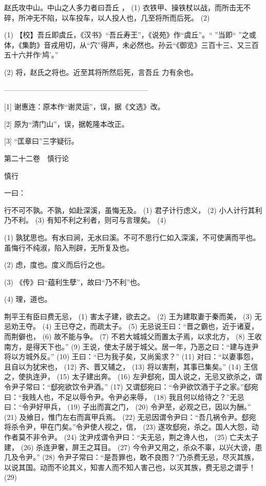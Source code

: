 \documentclass[12pt,UTF8]{ctexbook}
\begin{document}
赵氏攻中山。中山之人多力者曰吾丘 ， (1) 衣铁甲、操铁杖以战，而所击无不碎，所冲无不陷，以车投车，以人投人也，几至将所而后死。 (2)

(1) 【校】吾丘即虞丘，《汉书》“吾丘寿王”，《说苑》作“虞丘”。“ ”当即“ ”之或体，《集韵》音戎用切，从“穴”得声，未必然也。孙云“《御览》三百十三、又三百五十六并作‘鸠’。”

(2) 将，赵氏之将也。近至其将所然后死，言吾丘 力有余也。




————————————————————

[1] 谢惠连：原本作“谢灵运”，误，据《文选》改。

[2] 原为“清门山”，误，据乾隆本改正。

[3] “匡章曰”三字疑衍。





第二十二卷　慎行论



慎行


一曰：

行不可不孰。不孰，如赴深溪，虽悔无及。 (1) 君子计行虑义， (2) 小人计行其利乃不利。 (3) 有知不利之利者，则可与言理矣。 (4)

(1) 孰犹思也。有水曰涧，无水曰溪。不可不思行仁如入深溪，不可使满而平也。虽悔行不纯淑，陷入刑辟，无所复及也。

(2) 虑，度也。度义而后行之也。

(3) 《传》曰“蕴利生孽”，故曰“乃不利”也。

(4) 理，道也。

荆平王有臣曰费无忌， (1) 害太子建，欲去之。 (2) 王为建取妻于秦而美， (3) 无忌劝王夺。 (4) 王已夺之，而疏太子。 (5) 无忌说王曰：“晋之霸也，近于诸夏，而荆僻也， (6) 故不能与争。 (7) 不若大城城父而置太子焉，以求北方， (8) 王收南方，是得天下也。” (9) 王说，使太子居于城父。居一年，乃恶之曰：“建与连尹将以方城外反。” (10) 王曰：“已为我子矣，又尚奚求？” (11) 对曰：“以妻事怨，且自以为犹宋也， (12) 齐、晋又辅之， (13) 将以害荆，其事已集矣。” (14) 王信之，使执连尹， (15) 太子建出奔。 (16) 左尹郄宛，国人说之，无忌又欲杀之，谓令尹子常曰：“郄宛欲饮令尹酒。” (17) 又谓郄宛曰：“令尹欲饮酒于子之家。”郄宛曰：“我贱人也，不足以辱令尹。令尹必来辱， (18) 我且何以给待之？”无忌曰：“令尹好甲兵， (19) 子出而寘之门， (20) 令尹至，必观之已，因以为酬。” (21) 及飨日，惟门左右而寘甲兵焉。 (22) 无忌因谓令尹曰：“吾几祸令尹。郄宛将杀令尹，甲在门矣。”令尹使人视之，信， (23) 遂攻郄宛，杀之。国人大怨，动作者莫不非令尹。 (24) 沈尹戍谓令尹曰：“夫无忌，荆之谗人也， (25) 亡夫太子建， (26) 杀连尹奢，屏王之耳目。 (27) 今令尹又用之，杀众不辜，以兴大谤，患几及令尹。” (28) 令尹子常曰：“是吾罪也，敢不良图？”乃杀费无忌，尽灭其族，以说其国。动而不论其义，知害人而不知人害己也，以灭其族，费无忌之谓乎！ (29)
\end{document}
